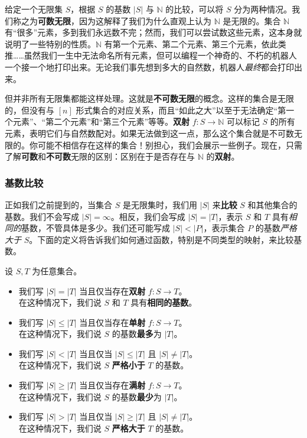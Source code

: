 给定一个无限集 $S$，根据 $S$ 的基数 $|S|$ 与 $\mathbb{N}$ 的比较，可以将 $S$ 分为两种情况。我们称之为\textbf{可数无限}，因为这解释了我们为什么直观上认为 $\mathbb{N}$ 是无限的。集合 $\mathbb{N}$ 有``很多''元素，多到我们永远数不完；然而，我们可以尝试数这些元素，这本身就说明了一些特别的性质。$\mathbb{N}$ 有第一个元素、第二个元素、第三个元素，依此类推……虽然我们一生中无法命名所有元素，但可以编程一个神奇的、不朽的机器人一个接一个地打印出来。无论我们事先想到多大的自然数，机器人\emph{最终}都会打印出来。

但并非所有无限集都能这样处理。这就是\textbf{不可数无限}的概念。这样的集合是无限的，但没有与 $[n]$ 形式集合的对应关系，而且``如此之大''以至于无法确定``第一个元素''、``第二个元素''和``第三个元素''等等。\textbf{双射} $f : S \to \mathbb{N}$ 可以标记 $S$ 的所有元素，表明它们与自然数配对。如果无法做到这一点，那么这个集合就是不可数无限的。你可能不相信存在这样的集合！别担心，我们会展示一些例子。现在，只需了解\textbf{可数}和\textbf{不可数}无限的区别：区别在于是否存在与 $\mathbb{N}$ 的\textbf{双射}。

\subsubsection*{基数比较}

正如我们之前提到的，当集合 $S$ 是无限集时，我们用 $|S|$ 来\textbf{比较} $S$ 和其他集合的基数。我们不会写成 $|S| = \infty$。相反，我们会写成 $|S| = |T|$，表示 $S$ 和 $T$ 具有\emph{相同的}基数，不管具体是多少。我们还可能写成 $|S| < |P|$，表示集合 $P$ 的基数\emph{严格大于} $S$。下面的定义将告诉我们如何通过函数，特别是不同类型的映射，来比较基数。

\begin{definition}
    设 $S, T$ 为任意集合。

    \begin{itemize}
        \item 我们写 $|S|=|T|$ 当且仅当存在\textbf{双射} $ f : S \to T$。\\
            在这种情况下，我们说 $S$ 和 $T$ 具有\textbf{相同的基数}。
        \item 我们写 $|S|\le|T|$ 当且仅当存在\textbf{单射} $ f : S \to T$。\\
            在这种情况下，我们说 $S$ 的基数\textbf{最多}为 $|T|$。
        \item 我们写 $|S|<|T|$ 当且仅当 $|S|\le|T|$ 且 $|S|\ne|T|$。\\
            在这种情况下，我们说 $S$ \textbf{严格小于} $T$ 的基数。
        \item 我们写 $|S|\ge|T|$ 当且仅当存在\textbf{满射} $ f : S \to T$。\\
            在这种情况下，我们说 $S$ 的基数\textbf{最少}为 $|T|$。
        \item 我们写 $|S|>|T|$ 当且仅当 $|S|\ge|T|$ 且 $|S|\ne|T|$。\\
            在这种情况下，我们说 $S$ \textbf{严格大于} $T$ 的基数。
    \end{itemize}
\end{definition}

